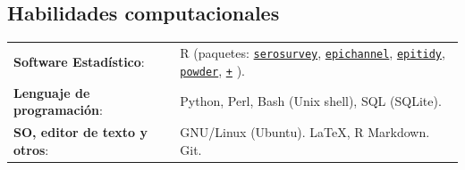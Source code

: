 \documentclass[margin,line]{res}
\begin{document}
\begin{resume}
		\section{\sc Habilidades computacionales}
		\begin{tabular}{ l l}
			{\bf Software Estadístico}: & R (paquetes: 
			\href{https://avallecam.github.io/serosurvey/}{\texttt{serosurvey}}, 
			\href{https://github.com/avallecam/epichannel}{\texttt{epichannel}}, 
			\href{https://github.com/avallecam/epitidy}{\texttt{epitidy}}, 
			\href{https://github.com/avallecam/powder}{\texttt{powder}}, 
			\href{https://github.com/avallecam?tab=repositories}{\texttt{+}}%
			).\\
			{\bf Lenguaje de programación}: & Python, Perl, Bash (Unix shell), SQL (SQLite).\\
			{\bf SO, editor de texto y otros}: & GNU/Linux (Ubuntu). \LaTeX, R Markdown. Git.\\ %
		\end{tabular}
		

\end{resume}
\end{document}
